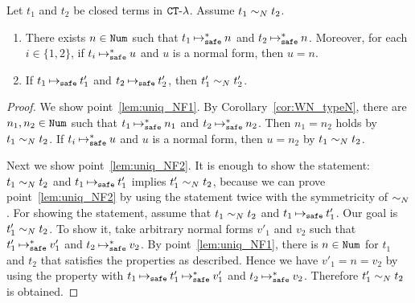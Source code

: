 \begin{lemma}\label{lem:uniq_NF}
  Let $t_1$ and $t_2$ be closed terms in ${ {\tt CT}\mbox{-}\lambda}$. 
  Assume $t_1 \sim_{N} t_2$. 
  \begin{enumerate}
  \item\label{lem:uniq_NF1}
    There exists $n \in {\tt Num}$ such that $t_1 \mathbin{\mathbin{\mapsto}_{\hbox{\scriptsize \tt safe}}^*} n$ and $t_2 \mathbin{\mathbin{\mapsto}_{\hbox{\scriptsize \tt safe}}^*} n$.
    Moreover, for each $i\in \{1,2\}$, if $t_i \mathbin{\mathbin{\mapsto}_{\hbox{\scriptsize \tt safe}}^*} u$ and $u$ is a normal form, then $u = n$. 
  \item\label{lem:uniq_NF2}
    If $t_1 \mathbin{\mathbin{\mapsto}_{\hbox{\scriptsize \tt safe}}} t'_1$ and $t_2 \mathbin{\mathbin{\mapsto}_{\hbox{\scriptsize \tt safe}}} t'_2$, then $t'_1 \sim_{N} t'_2$. 
  \end{enumerate}
  
\end{lemma}
\begin{proof}
  We show point~\ref{lem:uniq_NF1}. 
  By Corollary~\ref{cor:WN_typeN}, there are $n_1,n_2 \in {\tt Num}$ such that
  $t_1 \mathbin{\mathbin{\mapsto}_{\hbox{\scriptsize \tt safe}}^*} n_1$ and $t_2\mathbin{\mathbin{\mapsto}_{\hbox{\scriptsize \tt safe}}^*} n_2$.
  Then $n_1=n_2$ holds by $t_1\sim_{N} t_2$. 
  If $t_i \mathbin{\mathbin{\mapsto}_{\hbox{\scriptsize \tt safe}}^*} u$ and $u$ is a normal form, then $u = n_2$ by $t_1\sim_{N} t_2$.

  Next we show point~\ref{lem:uniq_NF2}.
  It is enough to show the statement: $t_1\sim_{N} t_2$ and $t_1 \mathbin{\mathbin{\mapsto}_{\hbox{\scriptsize \tt safe}}} t'_1$ implies $t'_1 \sim_{N} t_2$,
  because we can prove point~\ref{lem:uniq_NF2} by using the statement twice with the symmetricity of $\sim_{N}$. 
  For showing the statement, assume that $t_1\sim_{N} t_2$ and $t_1 \mathbin{\mathbin{\mapsto}_{\hbox{\scriptsize \tt safe}}} t'_1$. Our goal is $t'_1 \sim_{N} t_2$. 
  To show it, take arbitrary normal forms $v'_1$ and $v_2$ such that $t'_1 \mathbin{\mathbin{\mapsto}_{\hbox{\scriptsize \tt safe}}^*} v'_1$ and $t_2 \mathbin{\mathbin{\mapsto}_{\hbox{\scriptsize \tt safe}}^*} v_2$.
  By point~\ref{lem:uniq_NF1}, there is $n\in{\tt Num}$ for $t_1$ and $t_2$ that satisfies the properties as described.
  Hence we have $v'_1 = n = v_2$ by using the property with $t_1 \mathbin{\mathbin{\mapsto}_{\hbox{\scriptsize \tt safe}}} t'_1 \mathbin{\mathbin{\mapsto}_{\hbox{\scriptsize \tt safe}}^*} v'_1$ and $t_2 \mathbin{\mathbin{\mapsto}_{\hbox{\scriptsize \tt safe}}^*} v_2$. 
  Therefore $t'_1 \sim_{N} t_2$ is obtained. 
\end{proof}




